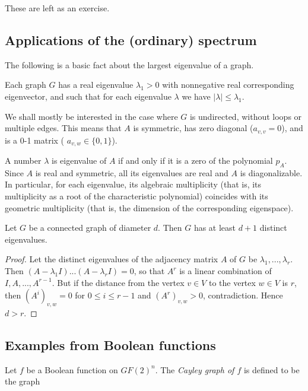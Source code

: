 These are left as an exercise.

\subsection{Applications of the (ordinary) spectrum}

The following is a basic fact about the largest eigenvalue of a graph.

\begin{theorem}
Each graph $G$ has a real eigenvalue $\lambda_1>0$ with nonnegative
real corresponding eigenvector, and such that for each
eigenvalue $\lambda$ we have $\vert \lambda \vert \le \lambda_1$.
\end{theorem}

We shall mostly be interested in the case where $G$ is undirected,
without loops or multiple edges. This means that $A$ is symmetric,
has zero diagonal ($a_{v,v} = 0$), and is a 0-1 matrix
( $a_{v,w} \in \{0,1\}$).

A number $\lambda$ is eigenvalue of $A$ if and only if it is a
zero of the polynomial $p_A$. Since $A$ is real and symmetric,
all its eigenvalues are real and $A$ is diagonalizable.
In particular, for each eigenvalue, its algebraic multiplicity
(that is, its multiplicity as a root of the characteristic
polynomial) coincides with its geometric multiplicity (that is, the
dimension of the corresponding eigenspace).

\begin{theorem}
Let $G$ be a connected graph of diameter $d$.
Then $G$ has at least $d + 1$ distinct eigenvalues.
\end{theorem}

\begin{proof}
Let the distinct eigenvalues of the adjacency matrix $A$ of
$G$ be $\lambda_1 , ... , \lambda_r$. Then
$(A - \lambda_1 I) ... (A - \lambda_r I) = 0$, so that
$A^r$ is a linear combination of $I, A, ... , A^{r-1}$.
But if the distance from the vertex $v\in V$ to the vertex $w\in V$ is
$r$, then $(A^i )_{v,w} = 0$ for $0 \le i \le r - 1$ and
$(A^r )_{v,w} > 0$, contradiction. Hence $d > r$.
\end{proof}

\subsection{Examples from Boolean functions}


Let $f$ be a Boolean function on $GF(2)^n$. 
The {\it Cayley graph of $f$} is defined to be the graph

